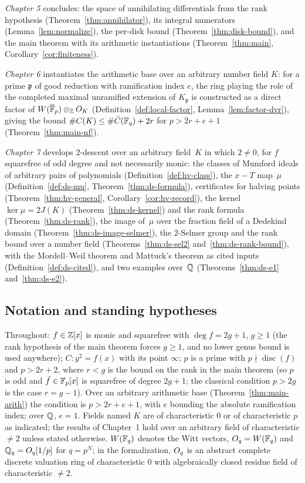 \emph{Chapter 5} concludes: the space of annihilating differentials from the rank
hypothesis (Theorem~\ref{thm:annihilator}), its integral numerators
(Lemma~\ref{lem:normalize}),
the per-disk bound (Theorem~\ref{thm:disk-bound}), and the main theorem with its
arithmetic instantiations (Theorem~\ref{thm:main}, Corollary~\ref{cor:finiteness}).

\emph{Chapter 6} instantiates the arithmetic base over an arbitrary number field $K$: for
a prime $\mathfrak p$ of good reduction with ramification index $e$, the ring playing the
role of the completed maximal unramified extension of $K_{\mathfrak p}$ is constructed as
a direct factor of $W(\overline{\mathbb{F}}_p) \otimes_{\mathbb{Z}} O_K$ (Definition~\ref{def:local-factor},
Lemma~\ref{lem:factor-dvr}), giving the bound
$\#C(K) \le \#\bar C(\mathbb{F}_q) + 2r$ for $p > 2r + e + 1$ (Theorem~\ref{thm:main-nf}).

\emph{Chapter 7} develops $2$-descent over an arbitrary field~$K$ in which $2 \ne 0$, for $f$
squarefree of odd degree and not necessarily monic: the classes of Mumford ideals of arbitrary
pairs of polynomials (Definition~\ref{def:hv-class}), the $x - T$ map~$\mu$
(Definition~\ref{def:ds-mu}, Theorem~\ref{thm:ds-formula}), certificates for halving points
(Theorem~\ref{thm:hv-general}, Corollary~\ref{cor:hv-record}), the kernel $\ker\mu = 2J(K)$
(Theorem~\ref{thm:ds-kernel}) and the rank formula (Theorem~\ref{thm:ds-rank}), the image of~$\mu$
over the fraction field of a Dedekind domain (Theorem~\ref{thm:ds-image-selmer}), the $2$-Selmer
group and the rank bound over a number field (Theorems~\ref{thm:ds-sel2}
and~\ref{thm:ds-rank-bound}), with the Mordell--Weil theorem and Mattuck's theorem as cited inputs
(Definition~\ref{def:ds-cited}), and two examples over~$\mathbb{Q}$ (Theorems~\ref{thm:ds-e1}
and~\ref{thm:ds-e2}).

\subsection*{Notation and standing hypotheses}

Throughout: $f \in \mathbb{Z}[x]$ is monic and squarefree with $\deg f = 2g+1$, $g \ge 1$ (the
rank hypothesis of the main theorem forces $g \ge 1$, and no lower genus bound is used
anywhere); $C \colon y^2 = f(x)$ with its point $\infty$; $p$ is a prime with
$p \nmid \operatorname{disc}(f)$ and $p > 2r + 2$, where $r < g$ is the bound on the rank
in the main theorem (so $p$ is odd and $\bar f \in \mathbb{F}_p[x]$ is squarefree of degree
$2g+1$; the classical condition $p > 2g$ is the case $r = g-1$). Over an arbitrary arithmetic base
(Theorem~\ref{thm:main-arith}) the condition is $p > 2r + e + 1$, with $e$ bounding the
absolute ramification index; over $\mathbb{Q}$, $e = 1$. Fields named $K$ are of characteristic $0$ or of
characteristic $p$ as indicated; the results of Chapter~1 hold over an arbitrary field of
characteristic $\ne 2$ unless stated otherwise. $W(\mathbb{F}_q)$ denotes the Witt vectors,
$O_q = W(\mathbb{F}_q)$ and $\mathbb{Q}_q = O_q[1/p]$ for $q = p^N$; in the formalization, $O_q$ is an
abstract complete discrete valuation ring of characteristic $0$ with algebraically closed
residue field of characteristic $\neq 2$.

